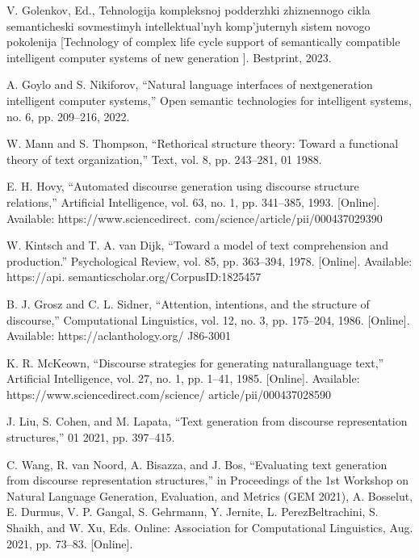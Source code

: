 \documentclass[a4paper]{article}
\begin{document}
\begin{multicols}{2}
\scriptsize
\begin{thebiblieography}
    

\cite{3} V. Golenkov, Ed., Tehnologija kompleksnoj podderzhki
zhiznennogo cikla semanticheski sovmestimyh intellektual’nyh
komp’juternyh sistem novogo pokolenija [Technology of complex
life cycle support of semantically compatible intelligent computer
systems of new generation ]. Bestprint, 2023.\par

\cite{4} A. Goylo and S. Nikiforov, “Natural language interfaces of nextgeneration intelligent computer systems,” Open semantic technologies for intelligent systems, no. 6, pp. 209–216, 2022.\par
\cite{5} W. Mann and S. Thompson, “Rethorical structure theory: Toward
a functional theory of text organization,” Text, vol. 8, pp. 243–281,
01 1988.\par
\cite{6} E. H. Hovy, “Automated discourse generation using discourse
structure relations,” Artificial Intelligence, vol. 63, no. 1, pp.
341–385, 1993. [Online]. Available: https://www.sciencedirect.
com/science/article/pii/000437029390\par
\cite{7} W. Kintsch and T. A. van Dijk, “Toward a model of
text comprehension and production.” Psychological Review,
vol. 85, pp. 363–394, 1978. [Online]. Available: https://api.
semanticscholar.org/CorpusID:1825457\par
\cite{8} B. J. Grosz and C. L. Sidner, “Attention, intentions, and the
structure of discourse,” Computational Linguistics, vol. 12, no. 3,
pp. 175–204, 1986. [Online]. Available: https://aclanthology.org/
J86-3001\par
\cite{9} K. R. McKeown, “Discourse strategies for generating naturallanguage text,” Artificial Intelligence, vol. 27, no. 1, pp. 1–41,
1985. [Online]. Available: https://www.sciencedirect.com/science/
article/pii/000437028590\par
\cite{10} J. Liu, S. Cohen, and M. Lapata, “Text generation from discourse
representation structures,” 01 2021, pp. 397–415.\par
\cite{11} C. Wang, R. van Noord, A. Bisazza, and J. Bos, “Evaluating
text generation from discourse representation structures,” in
Proceedings of the 1st Workshop on Natural Language
Generation, Evaluation, and Metrics (GEM 2021), A. Bosselut,
E. Durmus, V. P. Gangal, S. Gehrmann, Y. Jernite, L. PerezBeltrachini, S. Shaikh, and W. Xu, Eds. Online: Association
for Computational Linguistics, Aug. 2021, pp. 73–83. [Online].

\end{thebiblieography}
\end{multicols}
\end{document}
